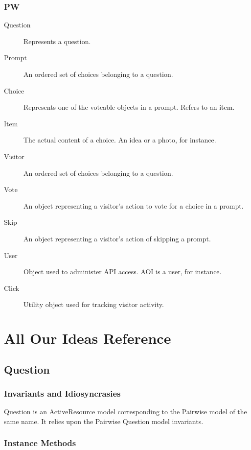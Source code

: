 \documentclass[11pt]{book}
\begin{document}
\subsection{PW}

\begin{description}
\item[Question] Represents a question.
\item[Prompt] An ordered set of choices belonging to a question.
\item[Choice] Represents one of the voteable objects in a prompt.  Refers to an item.
\item[Item] The actual content of a choice.  An idea or a photo, for instance.
\item[Visitor] An ordered set of choices belonging to a question.
\item[Vote] An object representing a visitor's action to vote for a choice in a prompt.
\item[Skip] An object representing a visitor's action of skipping a prompt.
\item[User] Object used to administer API access.  AOI is a user, for instance.
\item[Click] Utility object used for tracking visitor activity.


\end{description}



\chapter{All Our Ideas Reference}

\section{Question}

\subsection{Invariants and Idiosyncrasies}

Question is an ActiveResource model corresponding to the Pairwise model of the same name.  It relies upon the Pairwise Question model invariants.

\subsection{Instance Methods}
\end{document}
